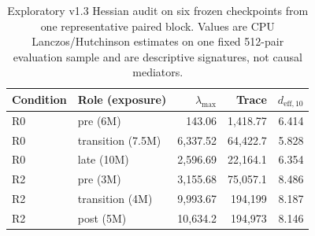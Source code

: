 \begin{table}[t]
\caption{Exploratory v1.3 Hessian audit on six frozen checkpoints from one
representative paired block. Values are CPU Lanczos/Hutchinson estimates on one
fixed 512-pair evaluation sample and are descriptive signatures, not causal
mediators.}
\label{tab:v13-hessian}
\centering
\small
\begin{tabular}{llrrr}
\toprule
Condition & Role (exposure) & $\lambda_{\max}$ & Trace & $d_{\mathrm{eff},10}$ \\
\midrule
R0 & pre (6M) & 143.06 & 1,418.77 & 6.414 \\
R0 & transition (7.5M) & 6,337.52 & 64,422.7 & 5.828 \\
R0 & late (10M) & 2,596.69 & 22,164.1 & 6.354 \\
R2 & pre (3M) & 3,155.68 & 75,057.1 & 8.486 \\
R2 & transition (4M) & 9,993.67 & 194,199 & 8.187 \\
R2 & post (5M) & 10,634.2 & 194,973 & 8.146 \\
\bottomrule
\end{tabular}
\end{table}
